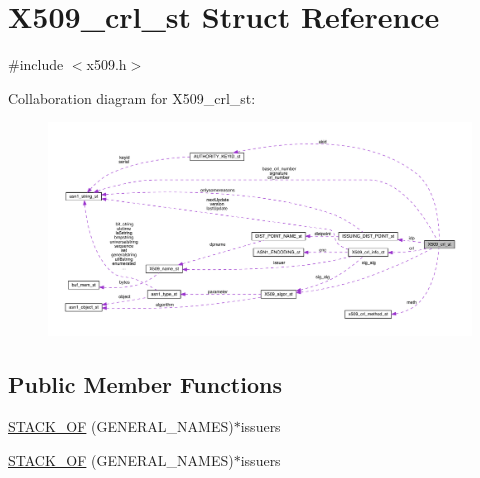 \hypertarget{struct_x509__crl__st}{}\section{X509\+\_\+crl\+\_\+st Struct Reference}
\label{struct_x509__crl__st}


{\ttfamily \#include $<$x509.\+h$>$}



Collaboration diagram for X509\+\_\+crl\+\_\+st\+:\nopagebreak
\begin{figure}[H]
\begin{center}
\leavevmode
\includegraphics[width=350pt]{struct_x509__crl__st__coll__graph}
\end{center}
\end{figure}
\subsection*{Public Member Functions}
\begin{DoxyCompactItemize}
\item 
\hyperlink{struct_x509__crl__st_aa47789b66a6bddf647afd466330744b2}{S\+T\+A\+C\+K\+\_\+\+OF} (G\+E\+N\+E\+R\+A\+L\+\_\+\+N\+A\+M\+ES)$\ast$issuers
\item 
\hyperlink{struct_x509__crl__st_aa47789b66a6bddf647afd466330744b2}{S\+T\+A\+C\+K\+\_\+\+OF} (G\+E\+N\+E\+R\+A\+L\+\_\+\+N\+A\+M\+ES)$\ast$issuers
\end{DoxyCompactItemize}
